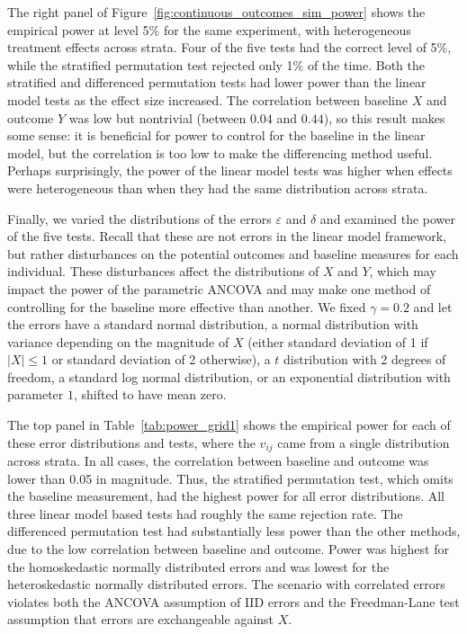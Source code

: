 \documentclass[12pt]{article}
\begin{document}
The right panel of Figure~\ref{fig:continuous_outcomes_sim_power} shows the empirical power at level 5\% for the same experiment, with heterogeneous treatment effects across strata.
Four of the five tests had the correct level of 5\%, while the stratified permutation test rejected only 1\% of the time.
Both the stratified and differenced permutation tests had lower power than the linear model tests as the effect size increased.
The correlation between baseline $X$ and outcome $Y$ was low but nontrivial (between $0.04$ and $0.44$), so this result makes some sense:
it is beneficial for power to control for the baseline in the linear model, but the correlation is too low to make the differencing method useful.
Perhaps surprisingly, the power of the linear model tests was higher when effects were heterogeneous than when they had the same distribution across strata.

Finally, we varied the distributions of the errors $\varepsilon$ and $\delta$ and examined the power of the five tests.
Recall that these are not errors in the linear model framework, but rather disturbances on the potential outcomes and baseline measures for each individual.
These disturbances affect the distributions of $X$ and $Y$, which may impact the power of the parametric ANCOVA and may make one method of controlling for the baseline more effective than another.
We fixed $\gamma=0.2$ and let the errors have a standard normal distribution, a normal distribution with variance depending on the magnitude of $X$ (either standard deviation of 1 if $\lvert X \rvert \leq 1$ or standard deviation of 2 otherwise), a $t$ distribution with 2 degrees of freedom, a standard log normal distribution, or an exponential distribution with parameter $1$, shifted to have mean zero.

The top panel in Table~\ref{tab:power_grid1} shows the empirical power for each of these error distributions and tests, where the $v_{ij}$ came from a single distribution across strata.
In all cases, the correlation between baseline and outcome was lower than 0.05 in magnitude.
Thus, the stratified permutation test, which omits the baseline measurement, had the highest power for all error distributions.
All three linear model based tests had roughly the same rejection rate.
The differenced permutation test had substantially less power than the other methods, due to the low correlation between baseline and outcome.
Power was highest for the homoskedastic normally distributed errors and was lowest for the heteroskedastic normally distributed errors.
The scenario with correlated errors violates both the ANCOVA assumption of IID errors and the Freedman-Lane test assumption that errors are exchangeable against $X$.
\end{document}
